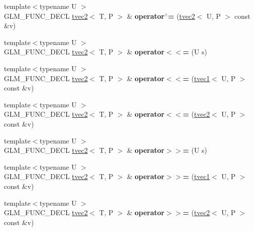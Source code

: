 \begin{DoxyCompactItemize}
\item 
\hypertarget{structglm_1_1tvec2_ac1398d1c0dbada005b4ed27a9a568c28}{{\footnotesize template$<$typename U $>$ }\\G\-L\-M\-\_\-\-F\-U\-N\-C\-\_\-\-D\-E\-C\-L \hyperlink{structglm_1_1tvec2}{tvec2}$<$ T, P $>$ \& {\bfseries operator$^\wedge$=} (\hyperlink{structglm_1_1tvec2}{tvec2}$<$ U, P $>$ const \&v)}\label{structglm_1_1tvec2_ac1398d1c0dbada005b4ed27a9a568c28}

\item 
\hypertarget{structglm_1_1tvec2_a05e705c90dcf562bf2cd0c112a91a129}{{\footnotesize template$<$typename U $>$ }\\G\-L\-M\-\_\-\-F\-U\-N\-C\-\_\-\-D\-E\-C\-L \hyperlink{structglm_1_1tvec2}{tvec2}$<$ T, P $>$ \& {\bfseries operator$<$$<$=} (U s)}\label{structglm_1_1tvec2_a05e705c90dcf562bf2cd0c112a91a129}

\item 
\hypertarget{structglm_1_1tvec2_a8f293425e914a1d7964907a89f6b492d}{{\footnotesize template$<$typename U $>$ }\\G\-L\-M\-\_\-\-F\-U\-N\-C\-\_\-\-D\-E\-C\-L \hyperlink{structglm_1_1tvec2}{tvec2}$<$ T, P $>$ \& {\bfseries operator$<$$<$=} (\hyperlink{structglm_1_1tvec1}{tvec1}$<$ U, P $>$ const \&v)}\label{structglm_1_1tvec2_a8f293425e914a1d7964907a89f6b492d}

\item 
\hypertarget{structglm_1_1tvec2_ad02c6fdf1c56884b2a65bf9135a28870}{{\footnotesize template$<$typename U $>$ }\\G\-L\-M\-\_\-\-F\-U\-N\-C\-\_\-\-D\-E\-C\-L \hyperlink{structglm_1_1tvec2}{tvec2}$<$ T, P $>$ \& {\bfseries operator$<$$<$=} (\hyperlink{structglm_1_1tvec2}{tvec2}$<$ U, P $>$ const \&v)}\label{structglm_1_1tvec2_ad02c6fdf1c56884b2a65bf9135a28870}

\item 
\hypertarget{structglm_1_1tvec2_ad8ca4987bb90df1b6d601b3e460c3d1b}{{\footnotesize template$<$typename U $>$ }\\G\-L\-M\-\_\-\-F\-U\-N\-C\-\_\-\-D\-E\-C\-L \hyperlink{structglm_1_1tvec2}{tvec2}$<$ T, P $>$ \& {\bfseries operator$>$$>$=} (U s)}\label{structglm_1_1tvec2_ad8ca4987bb90df1b6d601b3e460c3d1b}

\item 
\hypertarget{structglm_1_1tvec2_a44b9f53542701ce37c0806bc29a7c89c}{{\footnotesize template$<$typename U $>$ }\\G\-L\-M\-\_\-\-F\-U\-N\-C\-\_\-\-D\-E\-C\-L \hyperlink{structglm_1_1tvec2}{tvec2}$<$ T, P $>$ \& {\bfseries operator$>$$>$=} (\hyperlink{structglm_1_1tvec1}{tvec1}$<$ U, P $>$ const \&v)}\label{structglm_1_1tvec2_a44b9f53542701ce37c0806bc29a7c89c}

\item 
\hypertarget{structglm_1_1tvec2_aea51b73efe332b3fae252644ea44dc43}{{\footnotesize template$<$typename U $>$ }\\G\-L\-M\-\_\-\-F\-U\-N\-C\-\_\-\-D\-E\-C\-L \hyperlink{structglm_1_1tvec2}{tvec2}$<$ T, P $>$ \& {\bfseries operator$>$$>$=} (\hyperlink{structglm_1_1tvec2}{tvec2}$<$ U, P $>$ const \&v)}\label{structglm_1_1tvec2_aea51b73efe332b3fae252644ea44dc43}

\end{DoxyCompactItemize}
